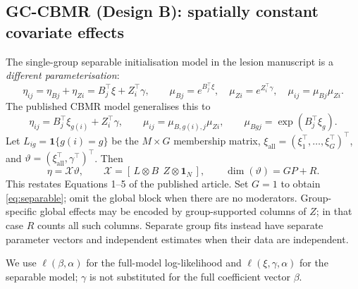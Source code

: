 \documentclass[11pt,a4paper]{article}
\numberwithin{equation}{section}
\begin{document}
\subsection{GC-CBMR (Design B): spatially constant covariate effects}\label{sec:group-design}
The single-group separable initialisation model in the lesion manuscript is
a \emph{different parameterisation}:
\begin{equation}\label{eq:separable}
 \eta_{ij}=\eta_{Bj}+\eta_{Zi}=B_j^\top\xi+Z_i^\top\gamma,\qquad
 \mu_{Bj}=e^{B_j^\top\xi},\quad \mu_{Zi}=e^{Z_i^\top\gamma},\quad
 \mu_{ij}=\mu_{Bj}\mu_{Zi}.
\end{equation}
The published CBMR model generalises this to
\begin{equation}\label{eq:group-predictor}
 \eta_{ij}=B_j^\top\xi_{g(i)}+Z_i^\top\gamma,\qquad
 \mu_{ij}=\mu_{B,g(i),j}\mu_{Zi},\qquad
 \mu_{Bgj}=\exp(B_j^\top\xi_g).
\end{equation}
Let $L_{ig}=\mathbf1\{g(i)=g\}$ be the $M\times G$ membership matrix,
$\xi_{\mathrm{all}}=(\xi_1^\top,\ldots,\xi_G^\top)^\top$, and
$\vartheta=(\xi_{\mathrm{all}}^\top,\gamma^\top)^\top$. Then
\begin{equation}\label{eq:group-design}
 \eta=\mathcal X\vartheta,\qquad
 \mathcal X=[\,L\otimes B\ \ Z\otimes\mathbf1_N\,],
 \qquad \dim(\vartheta)=GP+R.
\end{equation}
This restates Equations 1--5 of the published article. Set $G=1$ to obtain
\eqref{eq:separable}; omit the global block when there are no moderators.
Group-specific global effects may be encoded by group-supported columns of
$Z$; in that case $R$ counts all such columns. Separate group fits instead
have separate parameter vectors and independent estimates when their data
are independent.

We use $\ell(\beta,\alpha)$ for the full-model log-likelihood and
$\ell(\xi,\gamma,\alpha)$ for the separable model; $\gamma$ is not substituted
for the full coefficient vector $\beta$.
\end{document}
